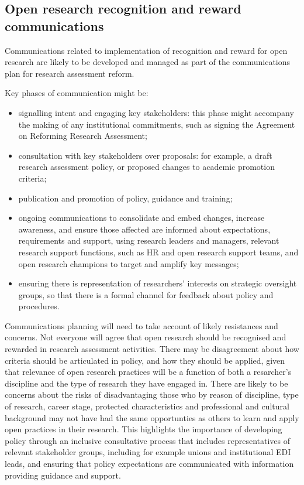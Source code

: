 \documentclass[
  letterpaper,
  DIV=11,
  numbers=noendperiod,
  oneside]{scrreprt}
\begin{document}
\subsection{Open research recognition and reward
communications}\label{open-research-recognition-and-reward-communications}

Communications related to implementation of recognition and reward for
open research are likely to be developed and managed as part of the
communications plan for research assessment reform.

Key phases of communication might be:

\begin{itemize}
\item
  signalling intent and engaging key stakeholders: this phase might
  accompany the making of any institutional commitments, such as signing
  the Agreement on Reforming Research Assessment;
\item
  consultation with key stakeholders over proposals: for example, a
  draft research assessment policy, or proposed changes to academic
  promotion criteria;
\item
  publication and promotion of policy, guidance and training;
\item
  ongoing communications to consolidate and embed changes, increase
  awareness, and ensure those affected are informed about expectations,
  requirements and support, using research leaders and managers,
  relevant research support functions, such as HR and open research
  support teams, and open research champions to target and amplify key
  messages;
\item
  ensuring there is representation of researchers' interests on
  strategic oversight groups, so that there is a formal channel for
  feedback about policy and procedures.
\end{itemize}

Communications planning will need to take account of likely resistances
and concerns. Not everyone will agree that open research should be
recognised and rewarded in research assessment activities. There may be
disagreement about how criteria should be articulated in policy, and how
they should be applied, given that relevance of open research practices
will be a function of both a resarcher's discipline and the type of
research they have engaged in. There are likely to be concerns about the
risks of disadvantaging those who by reason of discipline, type of
research, career stage, protected characteristics and professional and
cultural background may not have had the same opportunties as others to
learn and apply open practices in their research. This highlights the
importance of developing policy through an inclusive consultative
process that includes representatives of relevant stakeholder groups,
including for example unions and institutional EDI leads, and ensuring
that policy expectations are communicated with information providing
guidance and support.
\end{document}
